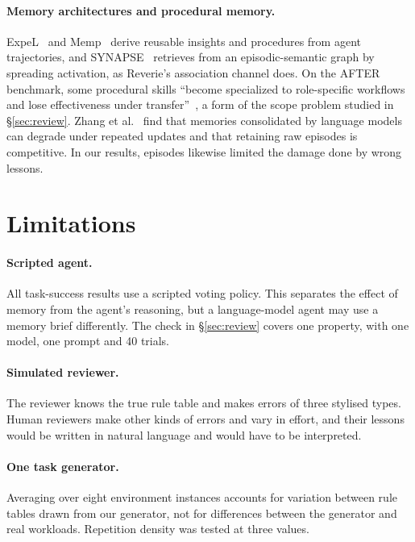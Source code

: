 \documentclass{article}
\begin{document}
\paragraph{Memory architectures and procedural memory.}
ExpeL~\cite{expel} and Memp~\cite{memp} derive reusable insights and procedures from
agent trajectories, and SYNAPSE~\cite{synapse} retrieves from an episodic-semantic graph
by spreading activation, as Reverie's association channel does. On the AFTER benchmark,
some procedural skills ``become specialized to role-specific workflows and lose
effectiveness under transfer''~\cite{belikova2026procedural}, a form of the scope problem
studied in \S\ref{sec:review}. Zhang et al.~\cite{faulty} find that memories consolidated by language
models can degrade under repeated updates and that retaining raw episodes is
competitive. In our results, episodes likewise limited the damage done by wrong lessons.

\section{Limitations}

\paragraph{Scripted agent.}
All task-success results use a scripted voting policy. This separates the effect of
memory from the agent's reasoning, but a language-model agent may use a memory brief
differently. The check in \S\ref{sec:review} covers one property, with one model, one
prompt and 40 trials.

\paragraph{Simulated reviewer.}
The reviewer knows the true rule table and makes errors of three stylised types. Human
reviewers make other kinds of errors and vary in effort, and their lessons would be
written in natural language and would have to be interpreted.

\paragraph{One task generator.}
Averaging over eight environment instances accounts for variation between rule tables
drawn from our generator, not for differences between the generator and real workloads.
Repetition density was tested at three values.
\end{document}
